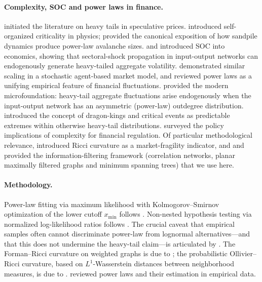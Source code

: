 \documentclass[12pt,a4paper]{article}
\begin{document}
\paragraph{Complexity, SOC and power laws in finance.}
\citet{Mandelbrot1963} initiated the literature on heavy tails in speculative
prices. \citet{BTW1987, BTW1988} introduced self-organized criticality in
physics; \citet{Bak1996} provided the canonical exposition of how sandpile
dynamics produce power-law avalanche sizes. \citet{Bak1993} and
\citet{Scheinkman1994} introduced SOC into economics, showing that
sectoral-shock propagation in input-output networks can endogenously generate
heavy-tailed aggregate volatility. \citet{LuxMarchesi1999} demonstrated
similar scaling in a stochastic agent-based market model, and
\citet{Gabaix2003, Gabaix2009} reviewed power laws as a unifying empirical
feature of financial fluctuations. \citet{Acemoglu2012} provided the modern
microfoundation: heavy-tail aggregate fluctuations arise endogenously when the
input-output network has an asymmetric (power-law) outdegree distribution.
\citet{Sornette2003, Sornette2009} introduced the concept of dragon-kings and
critical events as predictable extremes within otherwise heavy-tail
distributions. \citet{Battiston2016} surveyed the policy implications of
complexity for financial regulation. Of particular methodological relevance,
\citet{Sandhu2016} introduced Ricci curvature as a market-fragility indicator,
and \citet{Mantegna1999} and \citet{Tumminello2005} provided the
information-filtering framework (correlation networks, planar maximally
filtered graphs and minimum spanning trees) that we use here.

\paragraph{Methodology.}
Power-law fitting via maximum likelihood with Kolmogorov--Smirnov optimization
of the lower cutoff $x_{\min}$ follows \citet{Clauset2009}.
Non-nested hypothesis testing via normalized log-likelihood ratios follows
\citet{Vuong1989}. The crucial caveat that empirical samples often cannot
discriminate power-law from lognormal alternatives---and that this does not
undermine the heavy-tail claim---is articulated by \citet{StumpfPorter2012}.
The Forman--Ricci curvature on weighted graphs is due to \citet{Forman2003};
the probabilistic Ollivier--Ricci curvature, based on $L^1$-Wasserstein
distances between neighborhood measures, is due to \citet{Ollivier2009}.
\citet{NewmanPL2005} reviewed power laws and their estimation in empirical
data.
\end{document}
